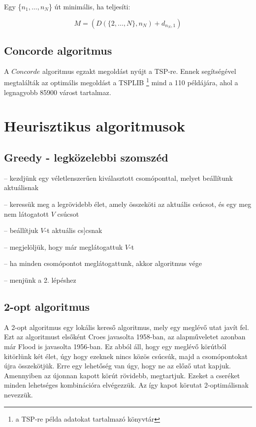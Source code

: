 Egy \{\(n_1, \dots, n_N\)\} út minimális, ha teljesíti:

\begin{equation}
M = (D(\{2, \dots, N\}, n_N)+d_{n_N, 1})
\end{equation}

\subsection{Concorde algoritmus}

A \(Concorde\) algoritmus egzakt megoldást nyújt a TSP-re. Ennek segítségével megtalálták az optimális megoldást a TSPLIB%
\footnote{ %
	a TSP-re példa adatokat tartalmazó könyvtár
}  %
 mind a 110 példájára, ahol a legnagyobb 85900 várost tartalmaz.

\section{Heurisztikus algoritmusok}\label{sec:ALAP:adatelem}

\subsection{Greedy - legközelebbi szomszéd}

\begin{description}
	\setlength{\itemsep}{0.04mm}
	\item[1. lépés] -- kezdjünk egy véletlenszerűen kiválasztott csomóponttal, melyet beállítunk aktuálisnak
	\item[2. lépés] -- keressük meg a legrövidebb élet, amely összeköti az aktuális csúcsot, és egy meg nem látogatott \(V\) csúcsot
	\item[3. lépés] -- beállítjuk \(V\)-t aktuális cs]csnak
	\item[4. lépés] -- megjelöljük, hogy már meglátogattuk \(V\)-t
	\item[5. lépés] -- ha minden csomópontot meglátogattunk, akkor algoritmus vége
	\item[6. lépés] -- menjünk a 2. lépéshez
\end{description}

\subsection{2-opt algoritmus}

A 2-opt algoritmus egy lokális kereső algoritmus, mely egy meglévő utat javít fel. Ezt az algoritmust elsőként Croes javasolta 1958-ban, az alapműveletet azonban már Flood is javasolta 1956-ban. Ez abból áll, hogy egy meglévő körútból kitörlünk két élet, úgy hogy ezeknek nincs közös csúcsúk, majd a csomópontokat újra összekötjük. Erre egy lehetőség van úgy, hogy ne az előző utat kapjuk. Amennyiben az újonnan kapott körút rövidebb, megtartjuk. Ezeket a cseréket minden lehetséges kombinációra elvégezzük. Az így kapot körutat 2-optimálisnak nevezzük.


